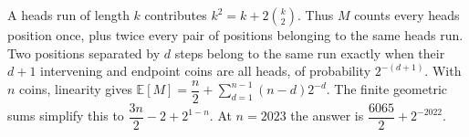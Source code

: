 A heads run of length $k$ contributes $k^2=k+2\binom k2$. Thus $M$ counts every heads position once, plus twice every pair of positions belonging to the same heads run. Two positions separated by $d$ steps belong to the same run exactly when their $d+1$ intervening and endpoint coins are all heads, of probability $2^{-(d+1)}$. With $n$ coins, linearity gives $\mathbb E[M]=\dfrac{n}{2}+\sum_{d=1}^{n-1}(n-d)2^{-d}$. The finite geometric sums simplify this to $\dfrac{3n}{2}-2+2^{1-n}$. At $n=2023$ the answer is $\boxed{\dfrac{6065}{2}+2^{-2022}}$.
